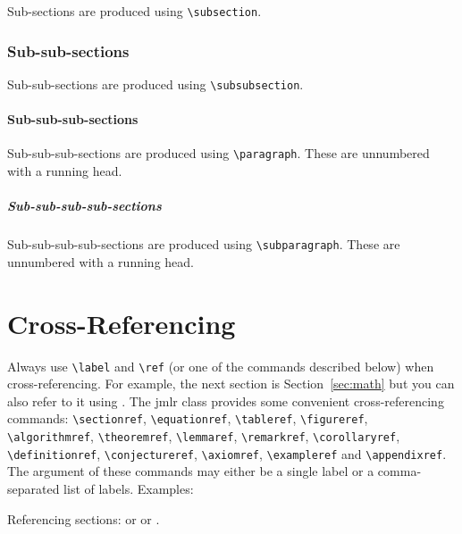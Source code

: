 \documentclass[tablecaption=bottom,wcp]{jmlr} %
\begin{document}
Sub-sections are produced using \verb|\subsection|.

\subsubsection{Sub-sub-sections}

Sub-sub-sections are produced using \verb|\subsubsection|.

\paragraph{Sub-sub-sub-sections}

Sub-sub-sub-sections are produced using \verb|\paragraph|.
These are unnumbered with a running head.

\subparagraph{Sub-sub-sub-sub-sections}

Sub-sub-sub-sub-sections are produced using \verb|\subparagraph|.
These are unnumbered with a running head.

\section{Cross-Referencing}

Always use \verb|\label| and \verb|\ref| (or one of the commands
described below) when cross-referencing.  For example, the next
section is Section~\ref{sec:math} but you can also refer to it using
. The \textsf{jmlr} class
provides some convenient cross-referencing commands:
\verb|\sectionref|, \verb|\equationref|, \verb|\tableref|,
\verb|\figureref|, \verb|\algorithmref|, \verb|\theoremref|,
\verb|\lemmaref|, \verb|\remarkref|, \verb|\corollaryref|,
\verb|\definitionref|, \verb|\conjectureref|, \verb|\axiomref|,
\verb|\exampleref| and \verb|\appendixref|. The argument of these
commands may either be a single label or a comma-separated list
of labels. Examples:

Referencing sections:  or
 or
.
\end{document}
